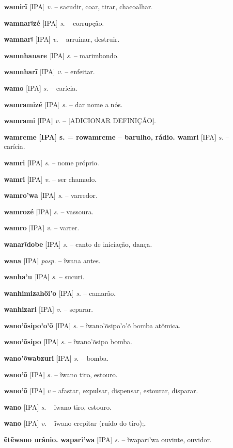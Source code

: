 \textbf{wamirĩ} [IPA] \textit{v.} -- sacudir, coar, tirar, chacoalhar.

\textbf{wamnarĩzé} [IPA] \textit{s.} -- corrupção.

\textbf{wamnarĩ} [IPA] \textit{v.} -- arruinar, destruir.

\textbf{wamnhanare} [IPA] \textit{s.} -- marimbondo.

\textbf{wamnharĩ} [IPA] \textit{v.} -- enfeitar.

\textbf{wamo} [IPA] \textit{s.} -- carícia.

\textbf{wamramizé} [IPA] \textit{s.} -- dar nome a nós.

\textbf{wamrami} [IPA] \textit{v.} -- [ADICIONAR DEFINIÇÃO].

\textbf{wamreme [IPA] s. = rowamreme -- barulho, rádio. wamri} [IPA] \textit{s.} -- carícia.

\textbf{wamri} [IPA] \textit{s.} -- nome próprio.

\textbf{wamri} [IPA] \textit{v.} -- ser chamado.

\textbf{wamro'wa} [IPA] \textit{s.} -- varredor.

\textbf{wamrozé} [IPA] \textit{s.} -- vassoura.

\textbf{wamro} [IPA] \textit{v.} -- varrer.

\textbf{wanarĩdobe} [IPA] \textit{s.} -- canto de iniciação, dança.

\textbf{wana} [IPA] \textit{posp.} -- ĩwana antes.

\textbf{wanha'u} [IPA] \textit{s.} -- sucuri.

\textbf{wanhimizahöi'o} [IPA] \textit{s.} -- camarão.

\textbf{wanhizari} [IPA] \textit{v.} -- separar.

\textbf{wano'õsipo'o'õ} [IPA] \textit{s.} -- ĩwano'õsipo'o'õ bomba atômica.

\textbf{wano'õsipo} [IPA] \textit{s.} -- ĩwano'õsipo bomba.

\textbf{wano'õwabzuri} [IPA] \textit{s.} -- bomba.

\textbf{wano'õ} [IPA] \textit{s.} -- ĩwano tiro, estouro.

\textbf{wano'õ} [IPA] \textit{v} -- afastar, expulsar, dispensar, estourar, disparar.

\textbf{wano} [IPA] \textit{s.} -- ĩwano tiro, estouro.

\textbf{wano} [IPA] \textit{v.} -- ĩwano crepitar (ruído do tiro);.

\textbf{ẽtẽwano urânio. wapari'wa} [IPA] \textit{s.} -- ĩwapari'wa ouvinte, ouvidor.

